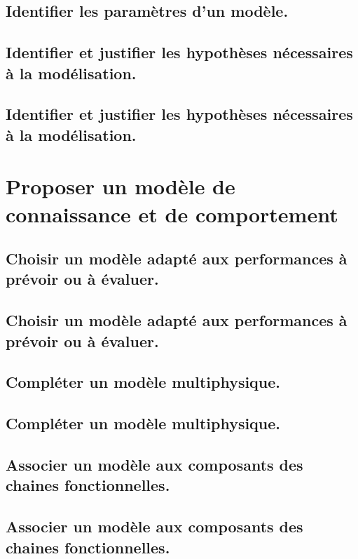 \documentclass[10pt,fleqn]{book}
\begin{document}
\subsection{Identifier les paramètres d’un modèle.} 

\subsection{Identifier et justifier les hypothèses nécessaires à la modélisation.} 

\subsection{Identifier et justifier les hypothèses nécessaires à la modélisation.} 

\section{Proposer un modèle de connaissance et de comportement} 

\subsection{Choisir un modèle adapté aux performances à prévoir ou à évaluer.} 

\subsection{Choisir un modèle adapté aux performances à prévoir ou à évaluer.} 

\subsection{Compléter un modèle multiphysique.} 

\subsection{Compléter un modèle multiphysique.} 

\subsection{Associer un modèle aux composants des chaines fonctionnelles.} 

\subsection{Associer un modèle aux composants des chaines fonctionnelles.} 
\end{document}
